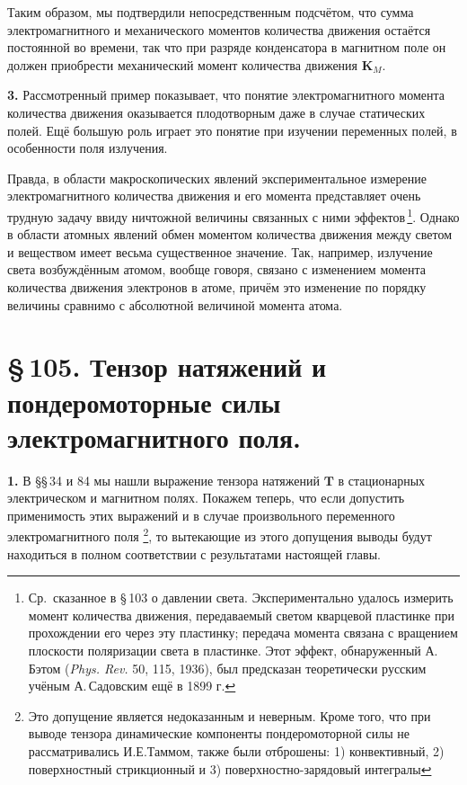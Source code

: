 \documentclass[a4paper,10pt]{article}
\newcommand{\redtext}[1]{\textcolor{redcolor}{#1}}
\newcommand{\modtext}[1]{\textcolor{modcolor}{#1}}
\begin{document}
Таким образом, мы подтвердили непосредственным подсчётом, что сумма
электромагнитного и механического моментов количества движения остаётся
постоянной во времени, так что при разряде конденсатора в магнитном поле
он должен приобрести механический момент количества движения $\mathbf{K}_M$.

\textbf{3.} Рассмотренный пример показывает, что понятие электромагнитного
момента количества движения оказывается плодотворным даже в случае
статических полей. Ещё большую роль играет это понятие при изучении
переменных полей, в особенности поля излучения.

Правда, в области макроскопических явлений экспериментальное измерение
электромагнитного количества движения и его момента представляет очень
трудную задачу ввиду ничтожной величины связанных с ними эффектов\,\footnote{Ср.\
сказанное в §\,103 о давлении света. Экспериментально удалось измерить
момент количества движения, передаваемый светом кварцевой пластинке при
прохождении его через эту пластинку; передача момента связана с вращением
плоскости поляризации света в пластинке. Этот эффект, обнаруженный А.\,Бэтом
(\textit{Phys. Rev.} 50, 115, 1936), был предсказан теоретически русским
учёным А.\,Садовским ещё в 1899 г.}. Однако в области атомных явлений
обмен моментом количества движения между светом и веществом имеет весьма
существенное значение. Так, например, излучение света возбуждённым
атомом, вообще говоря, связано с изменением момента количества движения
электронов в атоме, причём это изменение по порядку величины сравнимо
с абсолютной величиной момента атома.


\section*{\S\,105. Тензор натяжений и пондеромоторные силы
электромагнитного поля.}


\textbf{1.} В §§\,34 и 84 мы нашли выражение тензора натяжений
$\mathbf{T}$ в стационарных электрическом и магнитном полях. Покажем
теперь, что \redtext{если допустить применимость этих выражений и в случае
произвольного переменного электромагнитного поля}
\footnote{\modtext{Это допущение является недоказанным и неверным.
Кроме того, что при выводе тензора динамические компоненты пондеромоторной
силы не рассматривались И.Е.Таммом, также были отброшены:
1) конвективный, 2) поверхностный стрикционный
и 3) поверхностно-зарядовый интегралы}},
то вытекающие из этого допущения выводы будут находиться в полном соответствии с
результатами настоящей главы.
\end{document}
